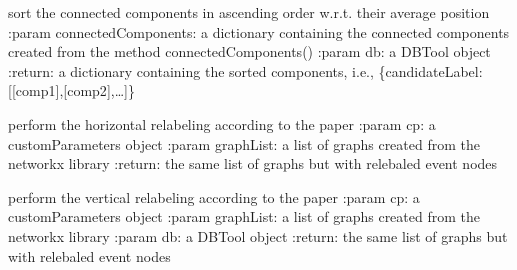 \documentclass[letterpaper,10pt,english]{sphinxmanual}
\begin{document}

\begin{fulllineitems}
\label{\detokenize{refinement:refinement.labelRefinement.sortConectedComponents}}
sort the connected components in ascending order w.r.t. their average position
:param connectedComponents:  a dictionary containing the connected components created from the method connectedComponents()
:param db: a DBTool object
:return: a dictionary containing the sorted components, i.e., \{candidateLabel: {[}{[}comp1{]},{[}comp2{]},…{]}\}

\end{fulllineitems}


\begin{fulllineitems}
\label{\detokenize{refinement:refinement.labelRefinement.horizontalRefinement}}
perform the horizontal relabeling according to the paper
:param cp:  a customParameters object
:param graphList: a list of graphs created from the networkx library
:return: the same list of graphs but with relebaled event nodes

\end{fulllineitems}


\begin{fulllineitems}
\label{\detokenize{refinement:refinement.labelRefinement.verticalRefinement}}
perform the vertical relabeling according to the paper
:param cp:  a customParameters object
:param graphList: a list of graphs created from the networkx library
:param db: a DBTool object
:return: the same list of graphs but with relebaled event nodes

\end{fulllineitems}
\end{document}
